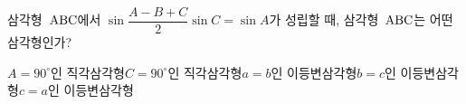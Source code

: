 삼각형~$\mathrm{ABC}$에서 $\sin\dfrac{A-B+C}{2}\sin C=\sin A$가 성립할 때, 삼각형~$\mathrm{ABC}$는 어떤 삼각형인가?
\begin{choicesii}{$A=90^\circ$인 직각삼각형}{$C=90^\circ$인 직각삼각형}{$a=b$인 이등변삼각형}{$b=c$인 이등변삼각형}{$c=a$인 이등변삼각형}\end{choicesii}
